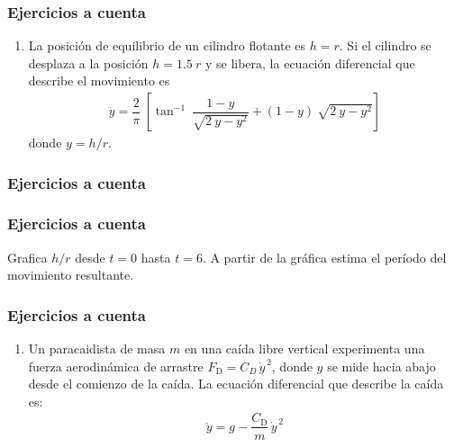 \documentclass[12pt]{beamer}
\begin{document}
\begin{frame}
\frametitle{Ejercicios a cuenta}
\begin{enumerate}
\item La posición de equilibrio de un cilindro flotante es $h = r$. Si el cilindro se desplaza a la posición $h = 1.5 \: r$ y se libera, la ecuación diferencial que describe el movimiento es
\begin{align*}
\ddot{y} = \dfrac{2}{\pi} \: \left[ \tan^{-1} \: \dfrac{1 - y}{\sqrt{2 \: y - y^{2}}} + (1 - y) \: \sqrt{2 \: y - y^{2}} \right]
\end{align*}
donde $y = h / r$.
\seti 
\end{enumerate}
\end{frame}
\begin{frame}
\frametitle{Ejercicios a cuenta}
\begin{figure}[H]
\centering
{}
\end{figure}
\end{frame}
\begin{frame}
\frametitle{Ejercicios a cuenta}
Grafica $h/r$ desde $t = 0$ hasta $t = 6$. A partir de la gráfica estima el período del movimiento resultante.
\end{frame}
\begin{frame}
\frametitle{Ejercicios a cuenta}
\begin{enumerate}
\conti
\item Un paracaidista de masa $m$ en una caída libre vertical experimenta una fuerza aerodinámica de arrastre $F_{\text{D}} = C_{D} \, \dot{y}^{\, 2}$, donde $y$ se mide hacia abajo desde el comienzo de la caída. La ecuación diferencial que describe la caída es:
\begin{align*}
\ddot{y} = g - \dfrac{C_{\text{D}}}{m} \, \dot{y}^{\, 2}
\end{align*}
\seti 
\end{enumerate}
\end{frame}
\end{document}
